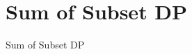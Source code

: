 \documentclass[aspectratio=169,xcolor=dvipsnames]{beamer}
\begin{document}
\section{Sum of Subset DP}
\begin{frame}[plain]{Sum of Subset DP}
\end{frame}
\end{document}
